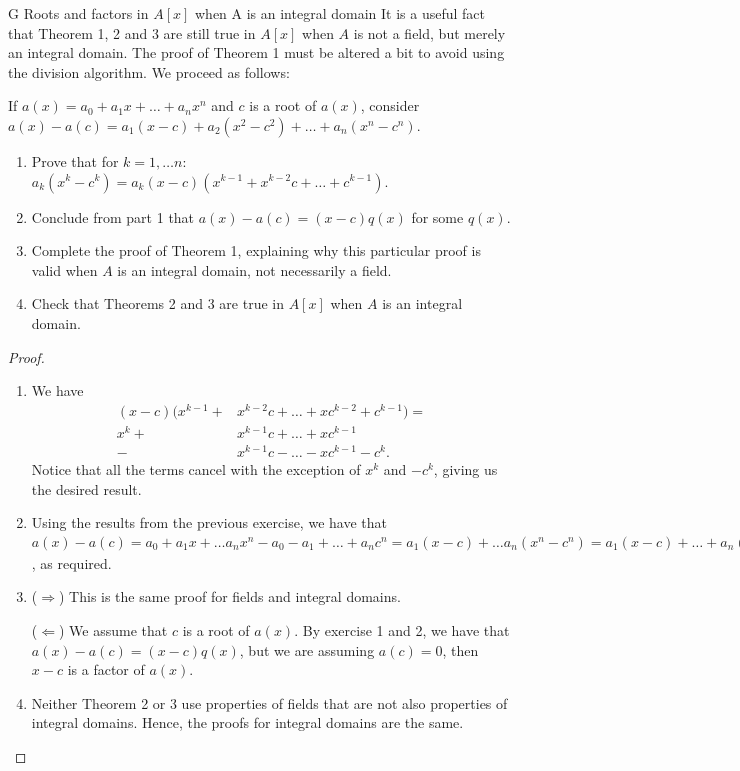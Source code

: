 \begin{exercise}{G Roots and factors in $A[x]$ when A is an integral domain}
It is a useful fact that Theorem 1, 2 and 3 are still true in $A[x]$ when $A$ is not a field, but merely an integral domain. The proof of Theorem 1 must be altered a bit to avoid using the division algorithm. We proceed as follows: 

If $a(x)=a_0+a_1x+\dots+a_nx^n$ and $c$ is a root of $a(x)$, consider $a(x)-a(c)=a_1(x-c)+a_2(x^2-c^2)+\dots+a_n(x^n-c^n)$.
\begin{enumerate}
    \item Prove that for $k=1,\dots n$: $a_k(x^k-c^k)=a_k(x-c)(x^{k-1}+x^{k-2}c+\dots+c^{k-1})$.
    \item Conclude from part 1 that $a(x)-a(c)=(x-c)q(x)$ for some $q(x)$.
    \item Complete the proof of Theorem 1, explaining why this particular proof is valid when $A$ is an integral domain, not necessarily a field.
    \item Check that Theorems 2 and 3 are true in $A[x]$ when $A$ is an integral domain.
\end{enumerate}
\end{exercise}
\begin{proof}
 \begin{enumerate}
     \item We have 
     \begin{align*}
         (x-c)(x^{k-1}+ &x^{k-2}c+\dots+xc^{k-2}+c^{k-1})=\\
               x^k+     &x^{k-1}c+\dots+xc^{k-1}\\
                       -&x^{k-1}c-\dots-xc^{k-1}-c^k.
     \end{align*}
     Notice that all the terms cancel with the exception of $x^k$ and $-c^k$, giving us the desired result.
     \item Using the results from the previous exercise, we have that $a(x)-a(c)= a_0+a_1x+\dots a_nx^n-a_0-a_1+\dots +a_nc^n= a_1(x-c)+\dots a_n(x^n-c^n)= a_1(x-c)+\dots +a_n(x-c)(x^{n-1}+\dots +c^{n-1})= (x-c)q(x)$, as required.
     \item ($\Rightarrow$) This is the same proof for fields and integral domains.

     ($\Leftarrow$) We assume that $c$ is a root of $a(x)$. By exercise 1 and 2, we have that $a(x)-a(c)=(x-c)q(x)$, but we are assuming $a(c)=0$, then $x-c$ is a factor of $a(x)$.
     \item Neither Theorem 2 or 3 use properties of fields that are not also properties of integral domains. Hence, the proofs for integral domains are the same.
 \end{enumerate}
\end{proof}